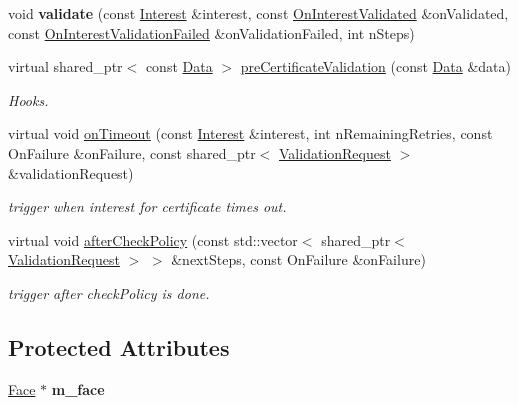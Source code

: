 \begin{DoxyCompactItemize}
\item 
void {\bfseries validate} (const \hyperlink{classndn_1_1Interest}{Interest} \&interest, const \hyperlink{namespacendn_a90fe4b4d97a7870d87f2fce8fdc88f95}{On\+Interest\+Validated} \&on\+Validated, const \hyperlink{namespacendn_a6cb4f04de7c1e8da06d8f5865b3d2877}{On\+Interest\+Validation\+Failed} \&on\+Validation\+Failed, int n\+Steps)\hypertarget{classndn_1_1Validator_a1fee554680b4b5262cbb1f6c7447255c}{}\label{classndn_1_1Validator_a1fee554680b4b5262cbb1f6c7447255c}

\item 
virtual shared\+\_\+ptr$<$ const \hyperlink{classndn_1_1Data}{Data} $>$ \hyperlink{classndn_1_1Validator_aff0a8652c0281368fc52301029a02c69}{pre\+Certificate\+Validation} (const \hyperlink{classndn_1_1Data}{Data} \&data)
\begin{DoxyCompactList}\small\item\em Hooks. \end{DoxyCompactList}\item 
virtual void \hyperlink{classndn_1_1Validator_a14a1affbfa5988bded108e550538db2f}{on\+Timeout} (const \hyperlink{classndn_1_1Interest}{Interest} \&interest, int n\+Remaining\+Retries, const On\+Failure \&on\+Failure, const shared\+\_\+ptr$<$ \hyperlink{classndn_1_1ValidationRequest}{Validation\+Request} $>$ \&validation\+Request)
\begin{DoxyCompactList}\small\item\em trigger when interest for certificate times out. \end{DoxyCompactList}\item 
virtual void \hyperlink{classndn_1_1Validator_a0ed9209ac3c18838e7d979894e92f046}{after\+Check\+Policy} (const std\+::vector$<$ shared\+\_\+ptr$<$ \hyperlink{classndn_1_1ValidationRequest}{Validation\+Request} $>$ $>$ \&next\+Steps, const On\+Failure \&on\+Failure)
\begin{DoxyCompactList}\small\item\em trigger after check\+Policy is done. \end{DoxyCompactList}\end{DoxyCompactItemize}
\subsection*{Protected Attributes}
\begin{DoxyCompactItemize}
\item 
\hyperlink{classndn_1_1Face}{Face} $\ast$ {\bfseries m\+\_\+face}\hypertarget{classndn_1_1Validator_ad7cedfaeb64892ea6426bccd78b26253}{}\label{classndn_1_1Validator_ad7cedfaeb64892ea6426bccd78b26253}

\end{DoxyCompactItemize}


